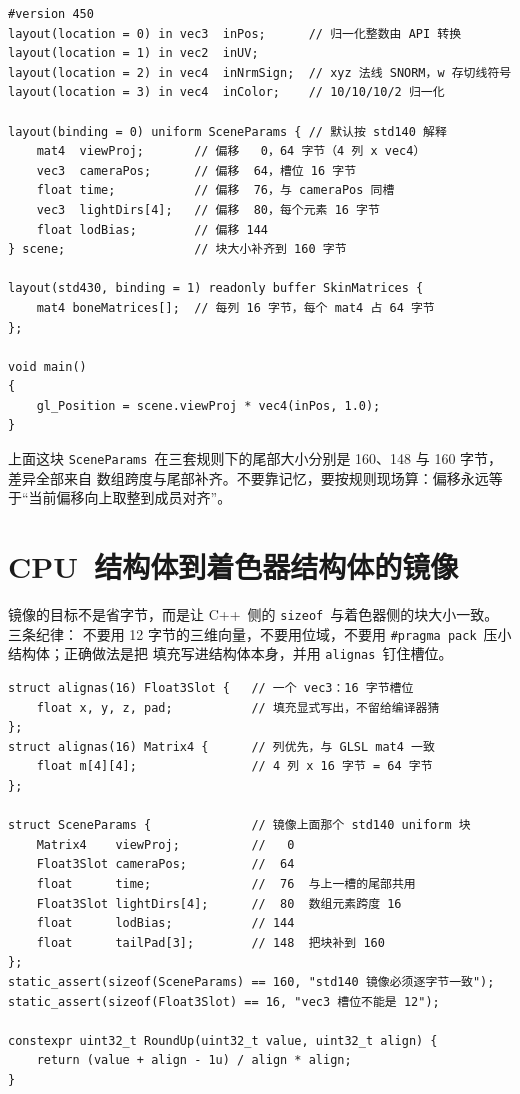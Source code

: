 \documentclass[12pt,a4paper,fontset=fandol]{ctexbook}
\newcommand{\Tp}[1]{\texttt{#1}}
\newcommand{\Lang}[1]{\textsf{#1}}
\newcommand{\CPP}{\Lang{C++}}
\newcommand{\DomCPU}{\Lang{CPU}}
\begin{document}
\begin{lstlisting}[style=glslstyle,caption={顶点属性声明与一个 std140 uniform 块：注释里的偏移量就是内存镜像},label={lst:ch03-glsl-layout}]
#version 450
layout(location = 0) in vec3  inPos;      // 归一化整数由 API 转换
layout(location = 1) in vec2  inUV;
layout(location = 2) in vec4  inNrmSign;  // xyz 法线 SNORM，w 存切线符号
layout(location = 3) in vec4  inColor;    // 10/10/10/2 归一化

layout(binding = 0) uniform SceneParams { // 默认按 std140 解释
    mat4  viewProj;       // 偏移   0，64 字节（4 列 x vec4）
    vec3  cameraPos;      // 偏移  64，槽位 16 字节
    float time;           // 偏移  76，与 cameraPos 同槽
    vec3  lightDirs[4];   // 偏移  80，每个元素 16 字节
    float lodBias;        // 偏移 144
} scene;                  // 块大小补齐到 160 字节

layout(std430, binding = 1) readonly buffer SkinMatrices {
    mat4 boneMatrices[];  // 每列 16 字节，每个 mat4 占 64 字节
};

void main()
{
    gl_Position = scene.viewProj * vec4(inPos, 1.0);
}
\end{lstlisting}

上面这块 \Tp{SceneParams}\ 在三套规则下的尾部大小分别是 160、148 与 160 字节，差异全部来自
数组跨度与尾部补齐。不要靠记忆，要按规则现场算：偏移永远等于``当前偏移向上取整到成员对齐''。

\section{\DomCPU\ 结构体到着色器结构体的镜像}

镜像的目标不是省字节，而是让 \CPP\ 侧的 \Tp{sizeof}\ 与着色器侧的块大小一致。三条纪律：
不要用 12 字节的三维向量，不要用位域，不要用 \Tp{\#pragma\ pack}\ 压小结构体；正确做法是把
填充写进结构体本身，并用 \Tp{alignas}\ 钉住槽位。

\begin{lstlisting}[style=cppstyle,caption={与 std140 块逐字节对齐的 C++ 镜像，含显式填充与静态校验},label={lst:ch03-cpp-mirror}]
struct alignas(16) Float3Slot {   // 一个 vec3：16 字节槽位
    float x, y, z, pad;           // 填充显式写出，不留给编译器猜
};
struct alignas(16) Matrix4 {      // 列优先，与 GLSL mat4 一致
    float m[4][4];                // 4 列 x 16 字节 = 64 字节
};

struct SceneParams {              // 镜像上面那个 std140 uniform 块
    Matrix4    viewProj;          //   0
    Float3Slot cameraPos;         //  64
    float      time;              //  76  与上一槽的尾部共用
    Float3Slot lightDirs[4];      //  80  数组元素跨度 16
    float      lodBias;           // 144
    float      tailPad[3];        // 148  把块补到 160
};
static_assert(sizeof(SceneParams) == 160, "std140 镜像必须逐字节一致");
static_assert(sizeof(Float3Slot) == 16, "vec3 槽位不能是 12");

constexpr uint32_t RoundUp(uint32_t value, uint32_t align) {
    return (value + align - 1u) / align * align;
}
\end{lstlisting}
\end{document}
